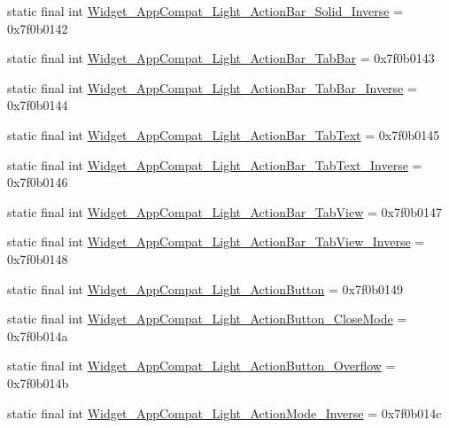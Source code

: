 \begin{CompactItemize}
\item 
static final int \hyperlink{classandroid_1_1support_1_1v7_1_1cardview_1_1_r_1_1style_4844b13b0666e260d0974b31e20aca60}{Widget\_\-AppCompat\_\-Light\_\-ActionBar\_\-Solid\_\-Inverse} = 0x7f0b0142
\item 
static final int \hyperlink{classandroid_1_1support_1_1v7_1_1cardview_1_1_r_1_1style_97a67d258fd9f6d45fd1ef2dbde8a3d3}{Widget\_\-AppCompat\_\-Light\_\-ActionBar\_\-TabBar} = 0x7f0b0143
\item 
static final int \hyperlink{classandroid_1_1support_1_1v7_1_1cardview_1_1_r_1_1style_567ba8914a2d6e3a68177a502e115cda}{Widget\_\-AppCompat\_\-Light\_\-ActionBar\_\-TabBar\_\-Inverse} = 0x7f0b0144
\item 
static final int \hyperlink{classandroid_1_1support_1_1v7_1_1cardview_1_1_r_1_1style_4f63cb39e11e2506660397e6960744d6}{Widget\_\-AppCompat\_\-Light\_\-ActionBar\_\-TabText} = 0x7f0b0145
\item 
static final int \hyperlink{classandroid_1_1support_1_1v7_1_1cardview_1_1_r_1_1style_2d5d9c3aa0732b52b511c4b5ab2a32d5}{Widget\_\-AppCompat\_\-Light\_\-ActionBar\_\-TabText\_\-Inverse} = 0x7f0b0146
\item 
static final int \hyperlink{classandroid_1_1support_1_1v7_1_1cardview_1_1_r_1_1style_09b970bf19982c6950f6d33d4bea7cd0}{Widget\_\-AppCompat\_\-Light\_\-ActionBar\_\-TabView} = 0x7f0b0147
\item 
static final int \hyperlink{classandroid_1_1support_1_1v7_1_1cardview_1_1_r_1_1style_c16085be1a4ddcf8f41cfc706567f6c4}{Widget\_\-AppCompat\_\-Light\_\-ActionBar\_\-TabView\_\-Inverse} = 0x7f0b0148
\item 
static final int \hyperlink{classandroid_1_1support_1_1v7_1_1cardview_1_1_r_1_1style_3358559d757a74e701d0770436a6f464}{Widget\_\-AppCompat\_\-Light\_\-ActionButton} = 0x7f0b0149
\item 
static final int \hyperlink{classandroid_1_1support_1_1v7_1_1cardview_1_1_r_1_1style_df6773f1b489381c0055d41a8da9faa2}{Widget\_\-AppCompat\_\-Light\_\-ActionButton\_\-CloseMode} = 0x7f0b014a
\item 
static final int \hyperlink{classandroid_1_1support_1_1v7_1_1cardview_1_1_r_1_1style_f220fc2c8435e6019d514995323ebb9e}{Widget\_\-AppCompat\_\-Light\_\-ActionButton\_\-Overflow} = 0x7f0b014b
\item 
static final int \hyperlink{classandroid_1_1support_1_1v7_1_1cardview_1_1_r_1_1style_f7a8fba72a5bc6bdf9199d6434018e5b}{Widget\_\-AppCompat\_\-Light\_\-ActionMode\_\-Inverse} = 0x7f0b014c

\end{CompactItemize}
